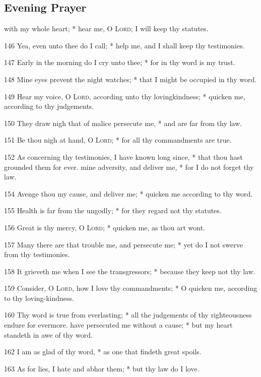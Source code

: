 \subsection{Evening Prayer}
 with my whole heart; * hear me, O {\textsc{Lord}}; I will keep thy statutes.\par
146 Yea, even unto thee do I call; * help me, and I shall keep thy testimonies.\par
147 Early in the morning do I cry unto thee; * for in thy word is my trust.\par
148 Mine eyes prevent the night watches; * that I might be occupied in thy word.\par
149 Hear my voice, O {\textsc{Lord}}, according unto thy lovingkindness; * quicken me, according to thy judgements.\par
150 They draw nigh that of malice persecute me, * and are far from thy law.\par
151 Be thou nigh at hand, O {\textsc{Lord}}; * for all thy commandments are true.\par
152 As concerning thy testimonies, I have known long since, * that thou hast grounded them for ever.
 mine adversity, and deliver me, * for I do not forget thy law.\par
154 Avenge thou my cause, and deliver me; * quicken me according to thy word.\par
155 Health is far from the ungodly; * for they regard not thy statutes.\par
156 Great is thy mercy, O {\textsc{Lord}}; * quicken me, as thou art wont.\par
157 Many there are that trouble me, and persecute me; * yet do I not swerve from thy testimonies.\par
158 It grieveth me when I see the transgressors; * because they keep not thy law.\par
159 Consider, O {\textsc{Lord}}, how I love thy commandments; * O quicken me, according to thy loving-kindness.\par
160 Thy word is true from everlasting; * all the judgements of thy righteousness endure for evermore.
 have persecuted me without a cause; * but my heart standeth in awe of thy word.\par
162 I am as glad of thy word, * as one that findeth great spoils.\par
163 As for lies, I hate and abhor them; * but thy law do I love.\par
